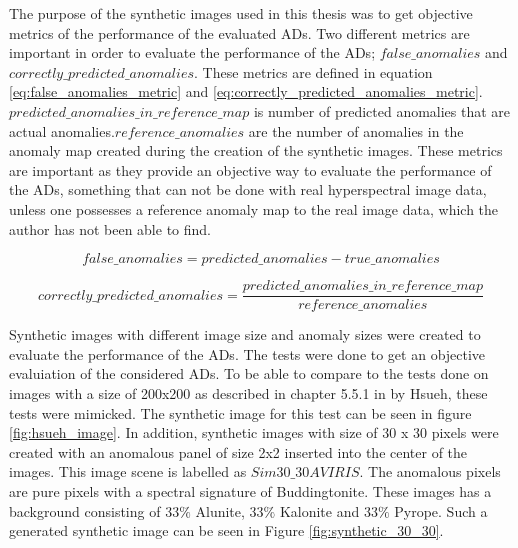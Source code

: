 The purpose of the synthetic images used in this thesis was to get objective metrics of the performance of the evaluated ADs. Two different metrics are important in order to evaluate the performance of the ADs; $false\_anomalies$ and $correctly\_predicted\_anomalies$. These metrics are defined in equation \ref{eq:false_anomalies_metric} and \ref{eq:correctly_predicted_anomalies_metric}. $predicted\_anomalies\_in\_reference\_map$ is number of predicted anomalies that are actual anomalies.$reference\_anomalies$ are the number of anomalies in the anomaly map created during the creation of the synthetic images. These metrics are important as they provide an objective way to evaluate the performance of the ADs, something that can not be done with real hyperspectral image data, unless one possesses a reference anomaly map to the real image data, which the author has not been able to find.  

\begin{equation}
    false\_anomalies = predicted\_anomalies - true\_anomalies
    \label{eq:false_anomalies_metric}
\end{equation}

\begin{equation}
    correctly\_predicted\_anomalies= \frac{predicted\_anomalies\_in\_reference\_map}{reference\_anomalies}
    \label{eq:correctly_predicted_anomalies_metric}
\end{equation}

Synthetic images with different image size and anomaly sizes were created to evaluate the performance of the ADs. The tests were done to get an objective evaluiation of the considered ADs.  To be able to compare to the tests done on images with a size of 200x200 as described in chapter 5.5.1 in \cite{hsueh_master_thesis} by Hsueh, these tests were mimicked. The synthetic image for this test can be seen in figure \ref{fig:hsueh_image}. In addition, synthetic images with size of 30 x 30 pixels were created with an anomalous panel of size 2x2 inserted into the center of the images. This image scene is labelled as $Sim30\_30AVIRIS$. The anomalous pixels are pure pixels with a spectral signature of Buddingtonite. These images has a background consisting of $33\%$ Alunite, $33\%$ Kalonite and $33\%$ Pyrope. Such a generated synthetic image can be seen in Figure \ref{fig:synthetic_30_30}.


